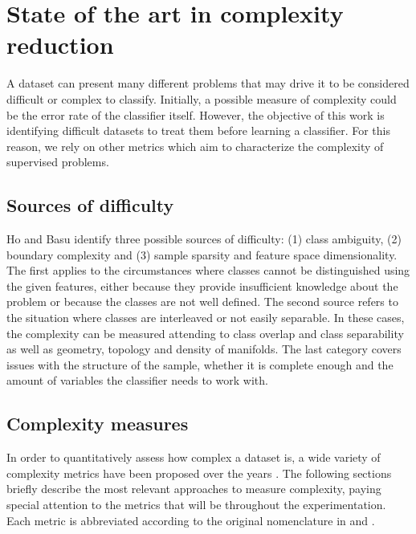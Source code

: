 \section{State of the art in complexity reduction}\label{p6sec.sota}

A dataset can present many different problems that may drive it to be considered difficult or complex to classify. Initially, a possible measure of complexity could be the error rate of the classifier itself. However, the objective of this work is identifying difficult datasets to treat them before learning a classifier. For this reason, we rely on other metrics which aim to characterize the complexity of supervised problems.

\subsection{Sources of difficulty}

Ho and Basu  identify three possible sources of difficulty: (1) class ambiguity, (2) boundary complexity and (3) sample sparsity and feature space dimensionality. The first applies to the circumstances where classes cannot be distinguished using the given features, either because they provide insufficient knowledge about the problem or because the classes are not well defined. The second source refers to the situation where classes are interleaved or not easily separable. In these cases, the complexity can be measured attending to class overlap and class separability as well as geometry, topology and density of manifolds. The last category covers issues with the structure of the sample, whether it is complete enough and the amount of variables the classifier needs to work with.


\subsection{Complexity measures}\label{p6sec.compmeas}

In order to quantitatively assess how complex a dataset is, a wide variety of complexity metrics have been proposed over the years . The following sections briefly describe the most relevant approaches to measure complexity, paying special attention to the metrics that will be  throughout the experimentation. Each metric is abbreviated according to the original nomenclature in  and .


